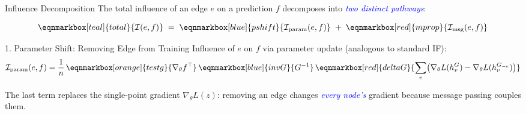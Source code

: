 \documentclass[aspectratio=169]{beamer}
\renewcommand{\emph}[1]{\textit{\textcolor{blue}{#1}}}
\begin{document}
\begin{frame}{Influence Decomposition}
    The total influence of an edge $e$ on a prediction $f$ decomposes into \emph{two distinct pathways}:

    \vspace{1.2cm}
    \begin{equation}
        \eqnmarkbox[teal]{total}{\mathcal{I}(e, f)} \;=\; \eqnmarkbox[blue]{pshift}{\mathcal{I}_{\text{param}}(e, f)} \;+\; \eqnmarkbox[red]{mprop}{\mathcal{I}_{\text{msg}}(e, f)}
    \end{equation}
    \pause
    \pause

\end{frame}

\begin{frame}{1. Parameter Shift: Removing Edge from Training}
    Influence of $e$ on $f$ via parameter update (analogous to standard IF):
    \vspace{2em}
    \begin{equation}
        \mathcal{I}_{\text{param}}(e, f) = \frac{1}{n}\,
        \eqnmarkbox[orange]{testg}{\nabla_\theta f^\top}\,
        \eqnmarkbox[blue]{invG}{G^{-1}}\,
        \eqnmarkbox[red]{deltaG}{\sum_v \!\left(\nabla_\theta L(h^G_v) - \nabla_\theta L(h^{G_{-e}}_v)\right)}
    \end{equation}
    \pause

    \vspace{1.5cm}
    The last term replaces the single-point gradient $\nabla_\theta L(z)$: removing an edge changes \emph{every node's} gradient because message passing couples them.
\end{frame}
\end{document}
